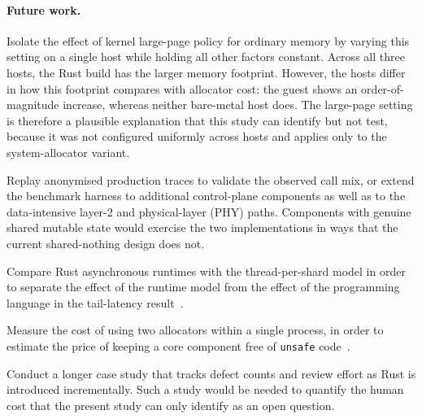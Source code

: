 \documentclass[english,oneside,a4paper,censored,csm,software-track-2020]{HYthesisML}
\begin{document}
\paragraph{Future work.}
\begin{compactitem}
\item Isolate the effect of kernel large-page policy for ordinary memory by
varying this setting on a single host while holding all other factors constant.
Across all three hosts, the Rust build has the larger memory footprint. However,
the hosts differ in how this footprint compares with allocator cost: the guest
shows an order-of-magnitude increase, whereas neither bare-metal host does. The
large-page setting is therefore a plausible explanation that this study can
identify but not test, because it was not configured uniformly across hosts and
applies only to the system-allocator variant.

\item Replay anonymised production traces to validate the observed call mix, or
extend the benchmark harness to additional control-plane components as well as
to the data-intensive layer-2 and physical-layer (PHY) paths. Components with
genuine shared mutable state would exercise the two implementations in ways that
the current shared-nothing design does not.

\item Compare Rust asynchronous runtimes with the thread-per-shard model in order
to separate the effect of the runtime model from the effect of the programming
language in the tail-latency result~\cite{arvidsson2025async}.

\item Measure the cost of using two allocators within a single process, in order
to estimate the price of keeping a core component free of \texttt{unsafe}
code~\cite{rivera2021galeed,kirth2022pkrusafe}.

\item Conduct a longer case study that tracks defect counts and review effort as
Rust is introduced incrementally. Such a study would be needed to quantify the
human cost that the present study can only identify as an open question.
\end{compactitem}



\cleardoublepage
{}

\printbibliography
\end{document}
